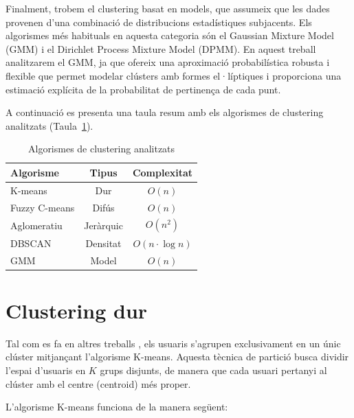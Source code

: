 \documentclass[a4paper,12pt]{report}
\begin{document}
Finalment, trobem el clustering basat en models, que assumeix que les dades provenen d’una combinació de distribucions estadístiques subjacents. Els algorismes més habituals en aquesta categoria són el Gaussian Mixture Model (GMM) i el Dirichlet Process Mixture Model (DPMM). En aquest treball analitzarem el GMM, ja que ofereix una aproximació probabilística robusta i flexible que permet modelar clústers amb formes el·líptiques i proporciona una estimació explícita de la probabilitat de pertinença de cada punt.

A continuació es presenta una taula resum amb els algorismes de clustering analitzats (Taula~\ref{tab:algorithms}).

\begin{table}[H]
    \centering
    \begin{tabular}{|l|c|c|}
    \hline
    \textbf{Algorisme} & \textbf{Tipus} & \textbf{Complexitat} \\ \hline
    K-means & Dur  & $O(n)$ \\ \hline
    Fuzzy C-means & Difús  & $O(n)$ \\ \hline
    Aglomeratiu & Jeràrquic  & $O(n^2)$ \\ \hline
    DBSCAN & Densitat  & $O(n \cdot \log n)$ \\ \hline
    GMM & Model  & $O(n)$ \\ \hline
    \end{tabular}
    \caption{Algorismes de clustering analitzats}
    \label{tab:algorithms}
\end{table}
 
\section{Clustering dur}

Tal com es fa en altres treballs \cite{dakhel2011new}, els usuaris s’agrupen exclusivament en un únic clúster mitjançant l’algorisme K-means. Aquesta tècnica de partició busca dividir l’espai d’usuaris en $K$ grups disjunts, de manera que cada usuari pertanyi al clúster amb el centre (centroid) més proper.

L’algorisme K-means funciona de la manera següent:
\end{document}
